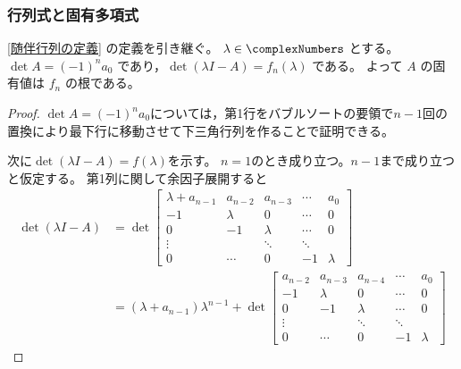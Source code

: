             \subsubsection{行列式と固有多項式}
                \label{随伴行列の行列式と固有多項式}
                \begin{shadebox}
                    \ref{随伴行列の定義} の定義を引き継ぐ。
                    $\lambda\in\complexNumbers$ とする。
                    $\det{A}=(-1)^n a_0$ であり，$\det{(\lambda I-A)} = f_n(\lambda)$ である。
                    よって $A$ の固有値は $f_n$ の根である。
                \end{shadebox}
                \begin{proof}
                    \quad\par
                    $\det{A}=(-1)^n a_0$については，第1行をバブルソートの要領で$n-1$回の置換により最下行に移動させて下三角行列を作ることで証明できる。
                    \par
                    次に$\det{(\lambda I-A)} = f(\lambda)$を示す。
                    $n=1$のとき成り立つ。$n-1$まで成り立つと仮定する。
                    第1列に関して余因子展開すると
                    \begin{align*}
                        \det{(\lambda I-A)} &= \det
                        \begin{bmatrix}
                            \lambda+a_{n-1} & a_{n-2} & a_{n-3} & \cdots & a_0 \\
                            -1 & \lambda & 0 & \cdots & 0 \\
                            0 & -1 & \lambda & \cdots & 0 \\
                            \vdots & & \ddots & \ddots \\
                            0 & \cdots & 0 & -1 & \lambda
                        \end{bmatrix} \\
                        &= (\lambda+a_{n-1})\lambda^{n-1} + \det
                        \begin{bmatrix}
                            a_{n-2} & a_{n-3} & a_{n-4} & \cdots & a_0 \\
                            -1 & \lambda & 0 & \cdots & 0 \\
                            0 & -1 & \lambda & \cdots & 0 \\
                            \vdots & & \ddots & \ddots \\
                            0 & \cdots & 0 & -1 & \lambda

\end{bmatrix}
\end{align*}
\end{proof}
